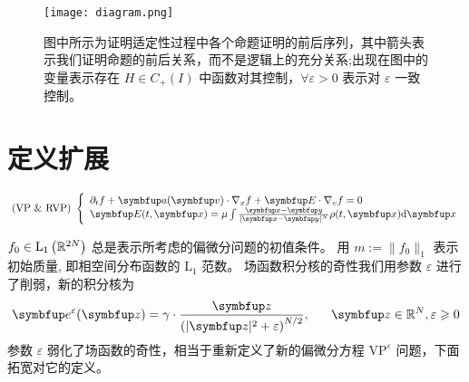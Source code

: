 

\begin{figure}[h]
    \centering
    \texttt{[image: diagram.png]}
    \caption{图中所示为证明适定性过程中各个命题证明的前后序列，其中箭头表示我们证明命题的前后关系，而不是逻辑上的充分关系;出现在图中的变量表示存在 $H\in C_+(I)$ 中函数对其控制，$\forall \varepsilon>0$ 表示对 $\varepsilon$ 一致控制。}
    \label{fig:diagram}
\end{figure}


\section{定义扩展}
\begin{equation}
    \label{eq:vp_ndim}
    \text { (VP \& RVP) }\left\{\begin{array}{l}
    \partial_{t} f+\vect{a}(\vv ) \cdot \nabla_{x} f+\vE \cdot \nabla_{v} f=0 \\
    \vE(t, \vx)=\mu\int \frac{\vx - \vect{y}}{|\vx - \vect{y}|^N} \rho(t,\vx) \mathrm{d} \vx %
\end{array}\right.\end{equation}


 $f_{0} \in \mathrm{L}_{1}\left({\mathbb{R}}^{2 N}\right)$ 总是表示所考虑的偏微分问题的初值条件。 用 $m:=\|f_{0}\|_{1}$ 表示初始质量, 即相空间分布函数的 $\mathrm{L}_1$ 范数。
场函数积分核的奇性我们用参数 $\varepsilon$ 进行了削弱，新的积分核为
$$\vect{e}^{\varepsilon}(\vect{z})=\gamma \cdot \frac{\vect{z}}{\left(|\vect{z}|^{2}+\varepsilon\right)^{N / 2}},~ \quad ~ \vect{z} \in \bbR^{N}, \varepsilon \geqslant 0$$
参数 $\varepsilon$ 弱化了场函数的奇性，相当于重新定义了新的偏微分方程 $\text{VP}^\varepsilon$ 问题，下面拓宽对它的定义。


